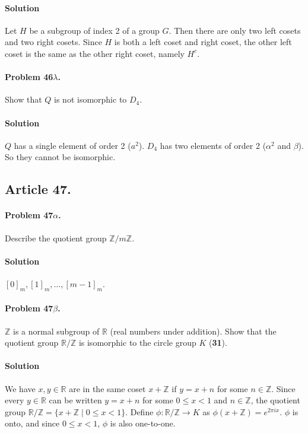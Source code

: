 \paragraph*{Solution}
Let $H$ be a subgroup of index 2 of a group $G$. Then there are only two left
cosets and two right cosets. Since $H$ is both a left coset and right coset,
the other left coset is the same as the other right coset, namely $H^c$.

\paragraph{Problem 46$\lambda$.}
Show that $Q$ is not isomorphic to $D_4$.

\paragraph*{Solution}
$Q$ has a single element of order 2 ($a^2$). $D_4$ has two elements of order
2 ($\alpha^2$ and $\beta$). So they cannot be isomorphic.

\subsection{Article 47.}

\paragraph{Problem 47$\alpha$.}
Describe the quotient group $\mathbb{Z} / m\mathbb{Z}$.

\paragraph*{Solution}
$[0]_m, [1]_m, \dots, [m-1]_m$.

\paragraph{Problem 47$\beta$.}
$\mathbb{Z}$ is a normal subgroup of $\mathbb{R}$ (real numbers under addition).
Show that the quotient group $\mathbb{R/Z}$ is isomorphic to the circle group
$K$ (\textbf{31}).

\paragraph*{Solution}
We have $x, y \in \mathbb{R}$ are in the same coset $x + \mathbb{Z}$ if
$y = x + n$ for some $n \in \mathbb{Z}$. Since every $ y \in \mathbb{R} $ can
be written $ y = x + n$ for some $ 0 \leq x < 1 $ and $ n \in \mathbb{Z}$, the
quotient group $\mathbb{R/Z} = \{ x + \mathbb{Z} \mid 0 \leq x < 1 \}$.
Define $\phi : \mathbb{R/Z} \rightarrow K$ as
$\phi (x+\mathbb{Z}) = e^{2\pi i x}$. $\phi$ is onto, and since $ 0 \leq x < 1$,
$\phi$ is also one-to-one.

